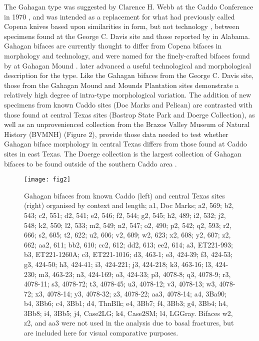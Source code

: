 \documentclass[review]{elsarticle}
\begin{document}
The Gahagan type was suggested by Clarence H. Webb at the Caddo Conference in 1970 \citep{RN3684}, and was intended as a replacement for what \cite{RN800} had previously called Copena knives based upon similarities in form, but not technology \citep{RN3684}, between specimens found at the George C. Davis site and those reported by \cite{RN11562} in Alabama. Gahagan bifaces are currently thought to differ from Copena bifaces in morphology and technology, and were named for the finely-crafted bifaces found by \cite{RN2740} at Gahagan Mound \citep{RN3684}. \citet[22]{RN4924} later advanced a useful technological and morphological description for the type. Like the Gahagan bifaces from the George C. Davis site, those from the Gahagan Mound and Mounds Plantation sites demonstrate a relatively high degree of intra-type morphological variation. The addition of new specimens from known Caddo sites (Doc Marks and Pelican) are contrasted with those found at central Texas sites (Bastrop State Park and Doerge Collection), as well as an unprovenienced collection from the Brazos Valley Museum of Natural History (BVMNH) (Figure 2), provide those data needed to test whether Gahagan biface morphology in central Texas differs from those found at Caddo sites in east Texas. The Doerge collection is the largest collection of Gahagan bifaces to be found outside of the southern Caddo area \citep[Table 5]{RN4924}.

\begin{figure}[ht!]\centering
\texttt{[image: fig2]}
\caption{Gahagan bifaces from known Caddo (left) and central Texas sites (right) organised by context and length; a1, Doc Marks; a2, 569; b2, 543; c2, 551; d2, 541; e2, 546; f2, 544; g2, 545; h2, 489; i2, 532; j2, 548; k2, 550; l2, 533; m2, 549; n2, 547; o2, 490; p2, 542; q2, 593; r2, 666; s2, 605; t2, 622; u2, 606; v2, 609; w2, 623; x2, 608; y2, 607; z2, 662; aa2, 611; bb2, 610; cc2, 612; dd2, 613; ee2, 614; a3, ET221-993; b3, ET221-1260A; c3, ET221-1016; d3, 463-1; e3, 424-39; f3, 424-53; g3, 424-50; h3, 424-41; i3, 424-221; j3, 424-218; k3, 463-16; l3, 424-230; m3, 463-23; n3, 424-169; o3, 424-33; p3, 4078-8; q3, 4078-9; r3, 4078-11; s3, 4078-72; t3, 4078-45; u3, 4078-12; v3, 4078-13; w3, 4078-72; x3, 4078-14; y3, 4078-32; z3, 4078-22; aa3, 4078-14; a4, 3Ba90; b4, 3Bb6; c4, 3Bb1; d4, ThnBlk; e4, 3Bb7; f4, 3Bb3; g4, 3Bb4; h4, 3Bb8; i4, 3Bb5; j4, Case2LG; k4, Case2SM; l4, LGGray. Bifaces w2, z2, and aa3 were not used in the analysis due to basal fractures, but are included here for visual comparative purposes.}
\label{fig:fig2}
\end{figure}
\end{document}
